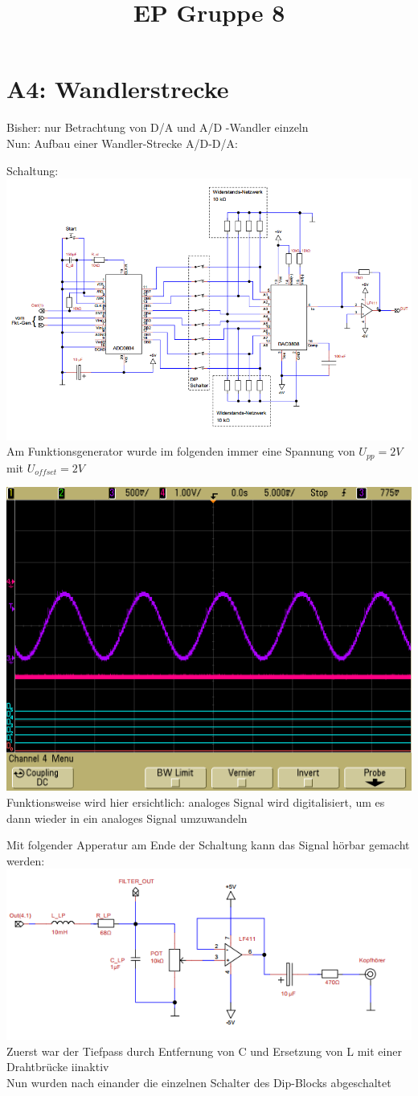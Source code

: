 \documentclass[compress,11pt]{beamer}
\title{EP Gruppe 8}
\begin{document}
\section{A4: Wandlerstrecke}
\begin{frame}
\begin{block}
Bisher: nur Betrachtung von D/A und A/D -Wandler einzeln\\
Nun: Aufbau einer Wandler-Strecke A/D-D/A:
\end{block}
Schaltung:\\
\includegraphics[width=.7\textwidth]{schalt41}\\
\tiny
Am Funktionsgenerator wurde im folgenden immer eine Spannung von $U_{pp} = 2 V$ mit $U_{offset} = 2 V$
\end{frame}
\begin{frame}
\includegraphics[width=.7\textwidth]{../vales_zeug/scope_128}\\
Funktionsweise wird hier ersichtlich: analoges Signal wird digitalisiert, um es dann wieder in ein analoges Signal umzuwandeln
\end{frame}
\begin{frame}
Mit folgender Apperatur am Ende der Schaltung kann das Signal hörbar gemacht werden:\\
\includegraphics[width=.7\textwidth]{schalt42}\\
Zuerst war der Tiefpass durch Entfernung von C und Ersetzung von L mit einer Drahtbrücke iinaktiv\\
Nun wurden nach einander die einzelnen Schalter des Dip-Blocks abgeschaltet
\end{frame}
\end{document}
